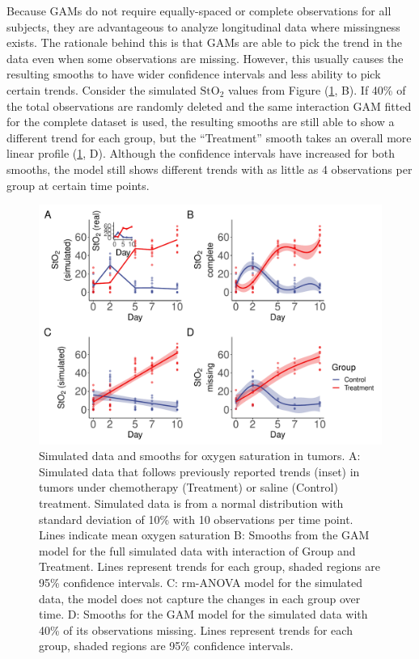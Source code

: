 \documentclass[
]{article}
\begin{document}
Because GAMs do not require equally-spaced or complete observations for all subjects, they are advantageous to analyze longitudinal data where missingness exists. The rationale behind this is that GAMs are able to pick the trend in the data even when some observations are missing. However, this usually causes the resulting smooths to have wider confidence intervals and less ability to pick certain trends. Consider the simulated \(\mbox{StO}_2\) values from Figure (\ref{fig:sim-smooth-plot}, B). If 40\% of the total observations are randomly deleted and the same interaction GAM fitted for the complete dataset is used, the resulting smooths are still able to show a different trend for each group, but the ``Treatment'' smooth takes an overall more linear profile (\ref{fig:sim-smooth-plot}, D). Although the confidence intervals have increased for both smooths, the model still shows different trends with as little as 4 observations per group at certain time points.



\begin{figure}[!h]

{\centering \includegraphics[width=0.75\linewidth,]{Full_document_files/figure-latex/sim-smooth-plot-1} 

}

\caption{Simulated data and smooths for oxygen saturation in tumors. A: Simulated data that follows previously reported trends (inset) in tumors under chemotherapy (Treatment) or saline (Control) treatment. Simulated data is from a normal distribution with standard deviation of 10\% with 10 observations per time point. Lines indicate mean oxygen saturation B: Smooths from the GAM model for the full simulated data with interaction of Group and Treatment. Lines represent trends for each group, shaded regions are 95\% confidence intervals. C: rm-ANOVA model for the simulated data, the model does not capture the changes in each group over time. D: Smooths for the GAM model for the simulated data with 40\% of its observations missing. Lines represent trends for each group, shaded regions are 95\% confidence intervals.}\label{fig:sim-smooth-plot}
\end{figure}
\end{document}
